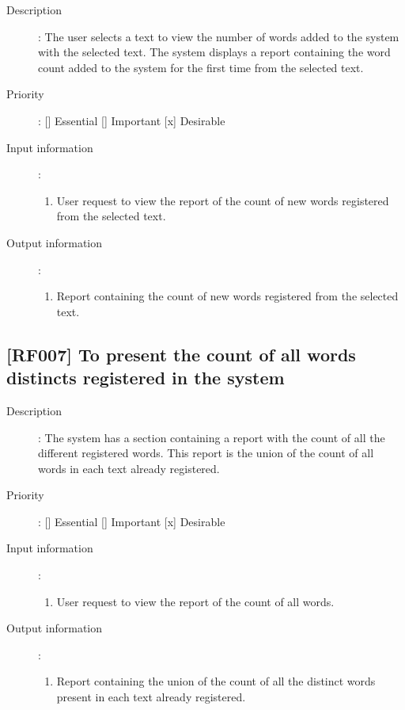 \documentclass[11pt, twoside, a4paper]{book}
\begin{document}
				\begin{description}
				
					\item[Description]: The user selects a text to view the number of words added to the system with the selected text. The system displays a report containing the word count added to the system for the first time from the selected text.
					\item[Priority]: [] Essential [] Important [x] Desirable
					\item[Input information]:
						\begin{enumerate}

							\item User request to view the report of the count of new words registered from the selected text.
							
						\end{enumerate}
					\item[Output information]:
						\begin{enumerate}
						
							\item Report containing the count of new words registered from the selected text.
																					
						\end{enumerate}
	
				\end{description}

			\subsection{[RF007] To present the count of all words distincts registered in the system}
				
				\begin{description}
					
					\item[Description]: The system has a section containing a report with the count of all the different registered words. This report is the union of the count of all words in each text already registered.
					\item[Priority]: [] Essential [] Important [x] Desirable
					\item[Input information]:
						\begin{enumerate}

							\item User request to view the report of the count of all words.
							
						\end{enumerate}
					\item[Output information]:
						\begin{enumerate}

							\item Report containing the union of the count of all the distinct words present in each text already registered.
																					
						\end{enumerate}
	
				\end{description}
		
\end{document}
